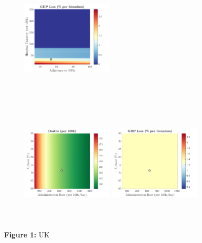 \documentclass[paper=a4, fontsize=11pt]{scrartcl}
\numberwithin{figure}{section}
\numberwithin{table}{section}
\begin{document}
\begin{figure}[H]
\begin{subfigure}[b]{\textwidth}
	\hspace{0.05cm}
    	\includegraphics[width=0.49\textwidth,height=6cm]{UK/SPANISH/npl_g}
    \end{subfigure}
    \begin{subfigure}[b]{\textwidth}
      	\includegraphics[width=0.49\textwidth,height=6cm]{UK/SPANISH/imm_d}
	\hspace{0.05cm}
    	\includegraphics[width=0.49\textwidth,height=6cm]{UK/SPANISH/imm_g}
    \end{subfigure}
\caption*{\textbf{Figure 1:} UK} 
\end{figure}
\end{document}
